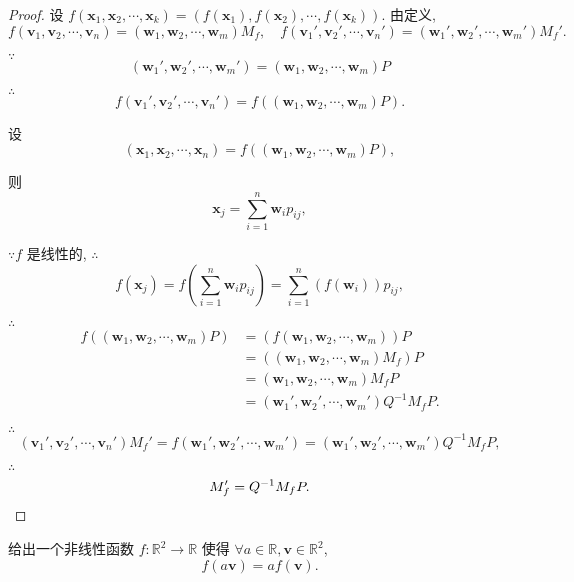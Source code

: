 \documentclass[color=black,device=normal,lang=cn,mode=geye]{elegantnote}
\begin{document}
\begin{proof}
    设 $f(\boldsymbol{x}_1,\boldsymbol{x}_2,\cdots,\boldsymbol{x}_k)=(f(\boldsymbol{x}_1),f(\boldsymbol{x}_2),\cdots,f(\boldsymbol{x}_k))$. 由定义,
    \[f(\boldsymbol{v}_1,\boldsymbol{v}_2,\cdots,\boldsymbol{v}_n)=(\boldsymbol{w}_1,\boldsymbol{w}_2,\cdots,\boldsymbol{w}_m)M_f,\quad f(\boldsymbol{v}_1',\boldsymbol{v}_2',\cdots,\boldsymbol{v}_n')=(\boldsymbol{w}_1',\boldsymbol{w}_2',\cdots,\boldsymbol{w}_m')M_f'.\]

    $\because$
    \[(\boldsymbol{w}_1',\boldsymbol{w}_2',\cdots,\boldsymbol{w}_m')=(\boldsymbol{w}_1,\boldsymbol{w}_2,\cdots,\boldsymbol{w}_m)P\]

    $\therefore$
    \[f(\boldsymbol{v}_1',\boldsymbol{v}_2',\cdots,\boldsymbol{v}_n')=f((\boldsymbol{w}_1,\boldsymbol{w}_2,\cdots,\boldsymbol{w}_m)P).\]

    设
    \[(\boldsymbol{x}_1,\boldsymbol{x}_2,\cdots,\boldsymbol{x}_n)=f((\boldsymbol{w}_1,\boldsymbol{w}_2,\cdots,\boldsymbol{w}_m)P),\]

    则
    \[\boldsymbol{x}_j=\sum\limits_{i=1}^n\boldsymbol{w}_ip_{ij},\]

    $\because f$ 是线性的, $\therefore$
    \[f(\boldsymbol{x}_j)=f\left(\sum\limits_{i=1}^n\boldsymbol{w}_ip_{ij}\right)=\sum\limits_{i=1}^n(f(\boldsymbol{w}_i))p_{ij},\]

    $\therefore$
    \begin{align*}
        f((\boldsymbol{w}_1,\boldsymbol{w}_2,\cdots,\boldsymbol{w}_m)P) & =(f(\boldsymbol{w}_1,\boldsymbol{w}_2,\cdots,\boldsymbol{w}_m))P \\
        & =((\boldsymbol{w}_1,\boldsymbol{w}_2,\cdots,\boldsymbol{w}_m)M_f)P \\
        & =(\boldsymbol{w}_1,\boldsymbol{w}_2,\cdots,\boldsymbol{w}_m)M_fP \\
        & =(\boldsymbol{w}_1',\boldsymbol{w}_2',\cdots,\boldsymbol{w}_m')Q^{-1}M_fP.
    \end{align*}

    $\therefore$
    \[(\boldsymbol{v}_1',\boldsymbol{v}_2',\cdots,\boldsymbol{v}_n')M_f'=f(\boldsymbol{w}_1',\boldsymbol{w}_2',\cdots,\boldsymbol{w}_m')=(\boldsymbol{w}_1',\boldsymbol{w}_2',\cdots,\boldsymbol{w}_m')Q^{-1}M_fP,\]

    $\therefore$
    \[M_f'=Q^{-1}M_fP.\qedhere\]
\end{proof}
\begin{exercisec}[2.1.4]
    给出一个非线性函数 $f:\mathbb{R}^2\to\mathbb{R}$ 使得 $\forall a\in\mathbb{R},\boldsymbol{v}\in\mathbb{R}^2$,
    \[f(a\boldsymbol{v})=af(\boldsymbol{v}).\]
\end{exercisec}
\end{document}
